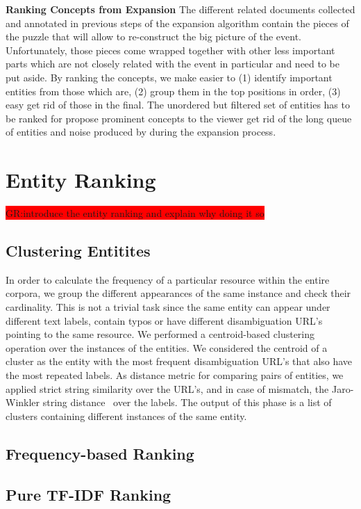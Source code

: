 \documentclass{llncs}
\newcommand{\todo}[1]{\colorbox{red}{#1}}
\begin{document}
{\bf Ranking Concepts from Expansion}
The different related documents collected and annotated in previous steps of the expansion algorithm contain the pieces of the puzzle that will allow to re-construct the big picture of the event. Unfortunately, those pieces come wrapped together with other less important parts which are not closely related with the event in particular and need to be put aside. By ranking the concepts, we make easier to (1) identify important entities from those which are, (2) group them in the top positions in order, (3) easy get rid of those in the final.
The unordered but filtered set of entities has to be ranked for propose prominent concepts to the viewer get rid of the long queue of entities and noise produced by during the expansion process.

\section{Entity Ranking}
\label{sec:Ranking}

\todo{GR:introduce the entity ranking and explain why doing it so}

\subsection{Clustering Entitites}
In order to calculate the frequency of a particular resource within the entire corpora, we group the different appearances of the same instance and check their cardinality. This is not a trivial task since the same entity can appear under different text labels, contain typos or have different disambiguation URL's pointing to the same resource. We performed a centroid-based clustering operation over the instances of the entities. We considered the centroid of a cluster as the entity with the most frequent disambiguation URL's that also have the most repeated labels. As distance metric for comparing pairs of entities, we applied strict string similarity over the URL's, and in case of mismatch, the Jaro-Winkler string distance~\cite{winkler2006overview} over the labels. The output of this phase is a list of clusters containing different instances of the same entity.

\subsection{Frequency-based Ranking}

\subsection{Pure TF-IDF Ranking}
\end{document}
